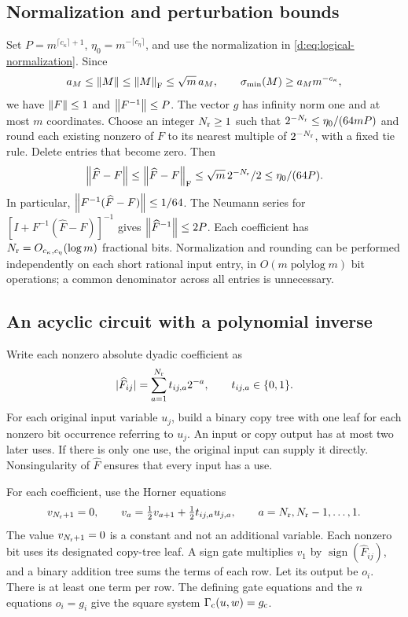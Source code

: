 \subsection{Normalization and perturbation bounds}

Set $P=m^{\lceil c_\kappa\rceil+1}$,
$\eta_0=m^{-\lceil c_\eta\rceil}$, and use the normalization in
\eqref{d:eq:logical-normalization}. Since
\begin{equation}
 a_M\le\left\lVert M\right\rVert\le\left\lVert M\right\rVert_{\mathrm F}\le\sqrt m\,a_M,
 \qquad \sigma_{\min}(M)\ge a_M m^{-c_\kappa},
\end{equation}
we have $\left\lVert F\right\rVert\le1$ and $\left\lVert F^{-1}\right\rVert\le P$.
The vector $g$ has infinity norm one and at most $m$ coordinates.
Choose an integer $N_{\rm r}\ge1$ such that
$2^{-N_{\rm r}}\le\eta_0/(64mP)$ and round each existing nonzero of $F$
to its nearest multiple of $2^{-N_{\rm r}}$, with a fixed tie rule. Delete entries
that become zero. Then
\begin{equation}
 \left\lVert \widehat F-F\right\rVert
 \le\left\lVert \widehat F-F\right\rVert_{\mathrm F}
 \le\sqrt m\,2^{-N_{\rm r}}/2\le\eta_0/(64P).
 \label{d:eq:app-dyadic-perturbation}
\end{equation}
In particular,
$\left\lVert F^{-1}(\widehat F-F)\right\rVert\le1/64$.
The Neumann series for
$[I+F^{-1}(\widehat F-F)]^{-1}$ gives
$\left\lVert \widehat F^{-1}\right\rVert\le2P$.
Each coefficient has $N_{\rm r}=O_{c_\kappa,c_\eta}(\log m)$ fractional bits. Normalization
and rounding can be performed independently on each short rational
input entry, in $O(m\operatorname{polylog}m)$ bit operations; a common
denominator across all entries is unnecessary.

\subsection{An acyclic circuit with a polynomial inverse}

Write each nonzero absolute dyadic coefficient as
\begin{equation}
 |\widehat F_{ij}|=\sum_{a=1}^{N_{\rm r}} t_{ij,a}2^{-a},
 \qquad t_{ij,a}\in\{0,1\}.
\end{equation}
For each original input variable $u_j$, build a binary copy tree with
one leaf for each nonzero bit occurrence referring to $u_j$. An input
or copy output has at most two later uses. If there is only one use,
the original input can supply it directly. Nonsingularity of
$\widehat F$ ensures that every input has a use.

For each coefficient, use the Horner equations
\begin{equation}
 v_{N_{\rm r}+1}=0,\qquad
 v_a=\tfrac12 v_{a+1}
       +\tfrac12 t_{ij,a}u_{j,a},\qquad a=N_{\rm r},N_{\rm r}-1,\ldots,1.
 \label{d:eq:app-horner}
\end{equation}
The value $v_{N_{\rm r}+1}=0$ is a constant and not an additional variable.
Each nonzero bit uses its designated copy-tree leaf. A sign gate
multiplies $v_1$ by $\operatorname{sign}(\widehat F_{ij})$, and a binary
addition tree sums the terms of each row. Let its output be $o_i$.
There is at least one term per row. The defining gate equations and
the $n$ equations $o_i=g_i$ give the square system
$\Gamma_{\rm c}(u,w)=g_{\rm c}$.

